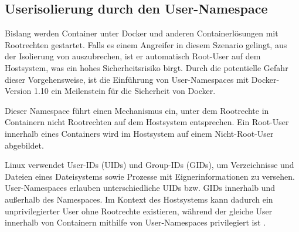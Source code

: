 \documentclass[../main.tex]{subfiles}
\begin{document}


    \subsection{Userisolierung durch den User-Namespace}
			Bislang werden Container unter Docker und anderen Containerlösungen mit Rootrechten gestartet. Falls es einem Angreifer in diesem Szenario gelingt, aus der Isolierung von \cbroken{} auszubrechen, ist er automatisch Root-User auf dem Hostsystem, was ein hohes Sicherheitsrisiko birgt. Durch die potentielle Gefahr dieser Vorgehensweise, ist die Einführung von User-Namespaces mit Docker-Version 1.10 ein Meilenstein für die Sicherheit von Docker.

			Dieser Namespace führt einen Mechanismus ein, unter dem Rootrechte in Containern nicht Rootrechten auf dem Hostsystem entsprechen. Ein Root-User innerhalb eines Containers wird im Hostsystem auf einem Nicht-Root-User abgebildet.

			Linux verwendet User-IDs (\acrshort{UID}s) und Group-IDs (\acrshort{GID}s), um Verzeichnisse und Dateien eines Dateisystems sowie Prozesse mit Eignerinformationen zu versehen. User-Namespaces erlauben unterschiedliche UIDs bzw. GIDs innerhalb und außerhalb des Namespaces. Im Kontext des Hostsystems kann dadurch ein unprivilegierter User ohne Rootrechte existieren, während der gleiche User innerhalb von Containern mithilfe von User-Namespaces privilegiert ist \cite{nsUser}.

\end{document}
